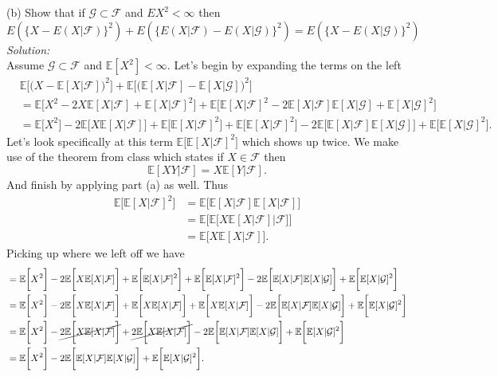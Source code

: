 \documentclass[10pt]{amsart}
\begin{document}
\noindent
(b) Show that if $\mathcal{G}\subset \mathcal{F}$ and $EX^2<\infty$ then
$$E(\{X-E(X|\mathcal{F})\}^2)+ E(\{E(X|\mathcal{F})-E(X|\mathcal{G})\}^2)=E(\{X-E(X|\mathcal{G})\}^2)$$
\textit{Solution:} \\
Assume $\mathcal G \subset \mathcal F$ and $\mathbb E [X^2] < \infty$.
Let's begin by expanding the terms on the left
\begin{align*}
& \mathbb E\bigg[\big(X - \mathbb E[X|\mathcal{F}]\big)^2\bigg]
	+ \mathbb E\bigg[\big(\mathbb E[X|\mathcal{F}] - \mathbb E[X|\mathcal{G}]\big)^2\bigg] \\
	&= \mathbb E\bigg[X^2 - 2X\mathbb E[X|\mathcal{F}] + \mathbb E[X|\mathcal{F}]^2\bigg]
	+ \mathbb E\bigg[\mathbb E[X|\mathcal{F}]^2 - 2\mathbb E[X|\mathcal{F}] \mathbb E[X|\mathcal{G}] + \mathbb E[X|\mathcal{G}]^2\bigg] \\
	&= \mathbb E\bigg[X^2\bigg]
		- 2\mathbb E\bigg[X\mathbb E[X|\mathcal{F}]\bigg]
		+ \mathbb E\bigg[\mathbb E[X|\mathcal{F}]^2\bigg]
		+ \mathbb E\bigg[\mathbb E[X|\mathcal{F}]^2\bigg]
		- 2\mathbb E\bigg[\mathbb E[X|\mathcal{F}] \mathbb E[X|\mathcal{G}]\bigg]
		+ \mathbb E\bigg[\mathbb E[X|\mathcal{G}]^2\bigg].
\end{align*}
Let's look specifically at this term $\mathbb E\big[\mathbb E[X|\mathcal{F}]^2\big]$ which shows up twice.
We make use of the theorem from class which states if $X \in \mathcal F$ then
$$\mathbb E [XY | \mathcal F] = X \mathbb E [Y | \mathcal F].$$
And finish by applying part (a) as well. Thus
\begin{align*}
\mathbb E\bigg[\mathbb E[X|\mathcal{F}]^2\bigg]
	&= \mathbb E\bigg[\mathbb E[X|\mathcal{F}] \mathbb E[X|\mathcal{F}] \bigg] \\
	&= \mathbb E\bigg[\mathbb E\big[X \mathbb E[X|\mathcal{F}] \big|\mathcal{F}\big] \bigg] \\
	&= \mathbb E\bigg[X \mathbb E[X|\mathcal{F}] \bigg].
\end{align*}
Picking up where we left off we have
\begin{align*}
	&= \mathbb E\bigg[X^2\bigg]
		- 2\mathbb E\bigg[X\mathbb E[X|\mathcal{F}]\bigg]
		+ \mathbb E\bigg[\mathbb E[X|\mathcal{F}]^2\bigg]
		+ \mathbb E\bigg[\mathbb E[X|\mathcal{F}]^2\bigg]
		- 2\mathbb E\bigg[\mathbb E[X|\mathcal{F}] \mathbb E[X|\mathcal{G}]\bigg]
		+ \mathbb E\bigg[\mathbb E[X|\mathcal{G}]^2\bigg] \\
	&= \mathbb E\bigg[X^2\bigg]
		- 2\mathbb E\bigg[X\mathbb E[X|\mathcal{F}]\bigg]
		+ \mathbb E\bigg[X \mathbb E[X|\mathcal{F}] \bigg]
		+ \mathbb E\bigg[X \mathbb E[X|\mathcal{F}] \bigg]
		- 2\mathbb E\bigg[\mathbb E[X|\mathcal{F}] \mathbb E[X|\mathcal{G}]\bigg]
		+ \mathbb E\bigg[\mathbb E[X|\mathcal{G}]^2\bigg] \\
	&= \mathbb E\bigg[X^2\bigg]
		- \cancel{2\mathbb E\bigg[X\mathbb E[X|\mathcal{F}]\bigg]}
		+ \cancel{2\mathbb E\bigg[X \mathbb E[X|\mathcal{F}] \bigg]}
		- 2\mathbb E\bigg[\mathbb E[X|\mathcal{F}] \mathbb E[X|\mathcal{G}]\bigg]
		+ \mathbb E\bigg[\mathbb E[X|\mathcal{G}]^2\bigg] \\
	&= \mathbb E\bigg[X^2\bigg]
		- 2\mathbb E\bigg[\mathbb E[X|\mathcal{F}] \mathbb E[X|\mathcal{G}]\bigg]
		+ \mathbb E\bigg[\mathbb E[X|\mathcal{G}]^2\bigg].
\end{align*}
\end{document}
